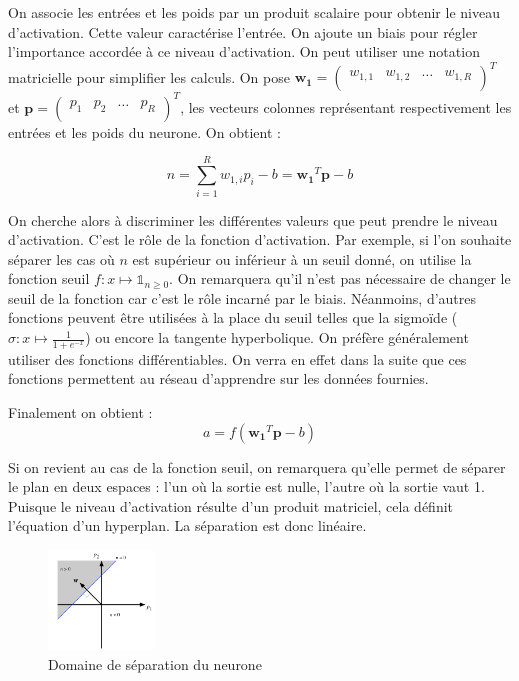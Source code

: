 On associe les entrées et les poids par un produit scalaire pour obtenir le niveau d'activation. Cette valeur caractérise l'entrée.
On ajoute un biais pour régler l'importance accordée à ce niveau d'activation. On peut utiliser une notation matricielle pour simplifier les calculs.
On pose $\mathbf{w_1} =
\begin{pmatrix}
  w_{1,1} & w_{1,2} & \ldots & w_{1,R}\\
\end{pmatrix}^T $ 
et
$ \mathbf{p} = 
\begin{pmatrix}
 p_1 & p_2 & \ldots & p_R \\
\end{pmatrix}^T $, 
les vecteurs colonnes représentant respectivement les entrées et les poids du neurone. On obtient :

\begin{equation} 
n = \sum_{i=1}^{R} w_{1,i} p_i - b = \mathbf{w_1}^T \mathbf{p} - b
\end{equation}

On cherche alors à discriminer les différentes valeurs que peut prendre le niveau d'activation. C'est le rôle de la fonction d'activation. Par exemple, si l'on souhaite séparer les cas où $n$ est supérieur ou inférieur à un seuil donné, on utilise la fonction seuil $ f : x \mapsto \mathds{1}_{n \geq 0} $. On remarquera qu'il n'est pas nécessaire de changer le seuil de la fonction car c'est le rôle incarné par le biais. Néanmoins, d'autres fonctions peuvent être utilisées à la place du seuil telles que la sigmoïde ($\sigma : x \mapsto \frac{1}{1+e^{-x}}$) ou encore la tangente hyperbolique.
On préfère généralement utiliser des fonctions différentiables. On verra en effet dans la suite que ces fonctions permettent au réseau d'apprendre sur les données fournies.

Finalement on obtient :
\begin{equation}
 a = f\left(\mathbf{w_1}^T \mathbf{p} - b\right)
\end{equation}

Si on revient au cas de la fonction seuil, on remarquera qu'elle permet de séparer le plan en deux espaces : l'un où la sortie est nulle, l'autre où la sortie vaut 1. Puisque le niveau d'activation résulte d'un produit matriciel, cela définit l'équation d'un hyperplan. La séparation est donc linéaire.

\begin{figure}[h]
 \centering
 \includegraphics[width=0.25\textwidth]{img/separation_lineaire_du_plan.png}
 \caption{Domaine de séparation du neurone}
\end{figure}

